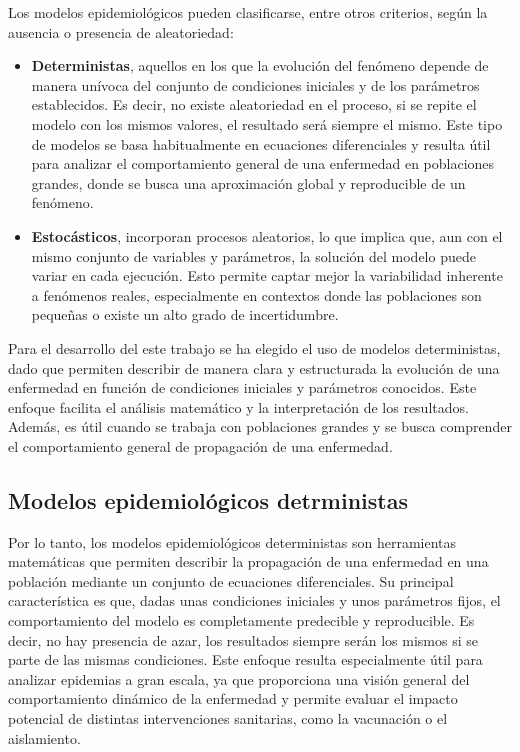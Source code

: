 \begin{enumerate}
Los modelos epidemiológicos pueden clasificarse, entre otros criterios, según la ausencia o presencia de aleatoriedad:
\begin{itemize}
    \item \textbf{Deterministas}, aquellos en los que la evolución del fenómeno depende de manera unívoca del conjunto de condiciones iniciales y de los parámetros establecidos. Es decir, no existe aleatoriedad en el proceso, si se repite el modelo con los mismos valores, el resultado será siempre el mismo. Este tipo de modelos se basa habitualmente en ecuaciones diferenciales y resulta útil para analizar el comportamiento general de una enfermedad en poblaciones grandes, donde se busca una aproximación global y reproducible de un fenómeno.
    \item \textbf{Estocásticos}, incorporan procesos aleatorios, lo que implica que, aun con el mismo conjunto de variables y parámetros, la solución del modelo puede variar en cada ejecución. Esto permite captar mejor la variabilidad inherente a fenómenos reales, especialmente en contextos donde las poblaciones son pequeñas o existe un alto grado de incertidumbre.
\end{itemize}
	
Para el desarrollo del este trabajo se ha elegido el uso de modelos deterministas, dado que permiten describir de manera clara y estructurada la evolución de una enfermedad en función de condiciones iniciales y parámetros conocidos. Este enfoque facilita el análisis matemático y la interpretación de los resultados. Además, es útil cuando se trabaja con poblaciones grandes y se busca comprender el comportamiento general de propagación de una enfermedad.

\subsection{Modelos epidemiológicos detrministas}
Por lo tanto, los modelos epidemiológicos deterministas son herramientas matemáticas que permiten describir la propagación de una enfermedad en una población mediante un conjunto de ecuaciones diferenciales. Su principal característica es que, dadas unas condiciones iniciales y unos parámetros fijos, el comportamiento del modelo es completamente predecible y reproducible. Es decir, no hay presencia de azar, los resultados siempre serán los mismos si se parte de las mismas condiciones. Este enfoque resulta especialmente útil para analizar epidemias a gran escala, ya que proporciona una visión general del comportamiento dinámico de la enfermedad y permite evaluar el impacto potencial de distintas intervenciones sanitarias, como la vacunación o el aislamiento.


\end{enumerate}
